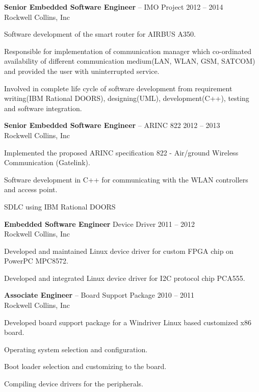 \documentclass{article}
\newcommand{\employer}[4]{{
\vspace*{2pt}%
\textbf{#1} #2 \hfill #3\\ #4 \vspace*{2pt}}
}
\renewcommand{\labelitemii}{
	\raisebox{0.3ex}{\tiny\textbullet}
}
\newenvironment{bullet-list-minor}{
\begin{list}{\labelitemii}{\setlength\leftmargin{15pt} 
\topsep 0pt \itemsep -2pt}}{\vspace*{4pt}\end{list}
}
\begin{document}
    \employer{Senior Embedded Software Engineer}{-- IMO Project}{2012 -- 2014}
    {Rockwell Collins, Inc}
    \begin{bullet-list-minor}
    \item Software development of the smart router for AIRBUS A350.
    \item Responsible for implementation of communication manager which co-ordinated availability of 
	    different communication medium(LAN, WLAN, GSM, SATCOM) and provided the user with uninterrupted service.
    \item Involved in complete life cycle of software development from
requirement writing(IBM Rational DOORS), designing(UML), development(C++), testing and software integration.
    \end{bullet-list-minor}

    \employer{Senior Embedded Software Engineer}{-- ARINC  822}{2012 -- 2013}
    {Rockwell Collins, Inc}
    \begin{bullet-list-minor}
    \item Implemented the proposed ARINC specification 822 - Air/ground
Wireless Communication (Gatelink).
    \item Software development in C++ for communicating with the WLAN controllers and
access point.
    \item SDLC using IBM Rational DOORS
    \end{bullet-list-minor}


    \employer{Embedded Software Engineer}{Device Driver }{2011 -- 2012}
    {Rockwell Collins, Inc}
    \begin{bullet-list-minor}
    \item Developed and maintained Linux device driver for custom FPGA chip on PowerPC MPC8572.
    \item Developed and integrated Linux device driver for I2C protocol chip PCA555.
    \end{bullet-list-minor}

    \employer{Associate Engineer}{-- Board Support Package}{2010 -- 2011}
    {Rockwell Collins, Inc}
    \begin{bullet-list-minor}
    \item Developed board support package for a Windriver Linux based customized x86 board.
    \item Operating system selection and configuration.
    \item Boot loader selection and customizing to the board.
    \item Compiling device drivers for the peripherals.
    \end{bullet-list-minor}
\end{document}
